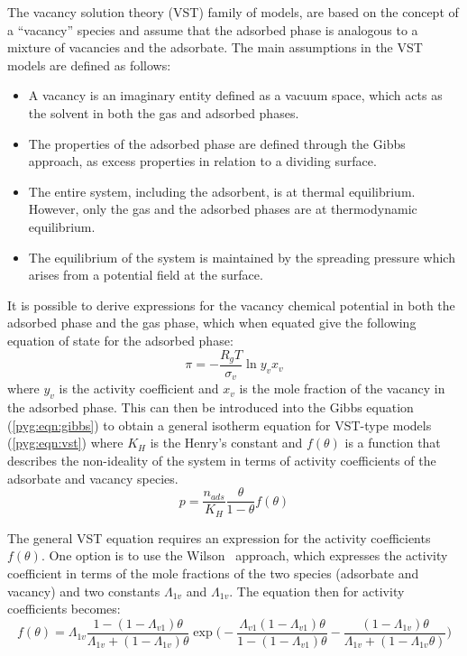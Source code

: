 The vacancy solution theory (VST) family of models,
are based on the concept of a “vacancy” species and
assume that the adsorbed phase is analogous to a mixture of
vacancies and the adsorbate. The main assumptions in the
VST models are defined as follows:

\begin{itemize}

	\item A vacancy is an imaginary entity defined as a vacuum
	      space, which acts as the solvent in both the gas and adsorbed
	      phases.
	\item The properties of the adsorbed phase are defined through
	      the Gibbs approach, as excess properties in relation to
	      a dividing surface.
	\item The entire system, including the adsorbent, is at
	      thermal equilibrium. However, only the gas and the adsorbed
	      phases are at thermodynamic equilibrium.
	\item The equilibrium of the system is maintained by the
	      spreading pressure which arises from a potential field
	      at the surface.

\end{itemize}

It is possible to derive expressions for the vacancy chemical
potential in both the adsorbed phase and the gas phase, which when
equated give the following equation of state for the adsorbed phase:
%
\begin{equation}
	\pi = - \frac{R_g T}{\sigma_v} \ln{y_v x_v}
\end{equation}
%
where \(y_v\) is the activity coefficient and \(x_v\) is the mole
fraction of the vacancy in the adsorbed phase.
This can then be introduced into the Gibbs equation (\autoref{pyg:eqn:gibbs})
to obtain a general isotherm equation for VST-type models
(\autoref{pyg:eqn:vst}) where \(K_H\) is the Henry’s constant and
\(f(\theta)\) is a function that describes the non-ideality of the
system in terms of activity coefficients of the adsorbate and
vacancy species.
%
\begin{equation}\label{pyg:eqn:vst}
	p = \frac{n_{ads}}{K_H} \frac{\theta}{1-\theta} f(\theta)
\end{equation}

The general VST equation requires an expression for the activity
coefficients \(f(\theta)\). One option is to use the
Wilson~\cite{suwanayuenGasAdsorptionIsotherm1980} approach,
which expresses the activity coefficient in terms
of the mole fractions of the two species (adsorbate and vacancy) and
two constants \(\Lambda_{1v}\) and \(\Lambda_{1v}\). The equation
then for activity coefficients becomes:
%
\begin{equation}\label{pyg:eqn:wvst}
	f(\theta) = \Lambda_{1v}
	\frac{1-(1-\Lambda_{v1})\theta}{\Lambda_{1v}+(1-\Lambda_{1v})\theta}
	\exp{\bigg(
		-\frac{\Lambda_{v1}(1-\Lambda_{v1})\theta}{1-(1-\Lambda_{v1})\theta}
		-\frac{(1 - \Lambda_{1v})\theta}{\Lambda_{1v} +
			(1-\Lambda_{1v}\theta)} \bigg)}
\end{equation}

